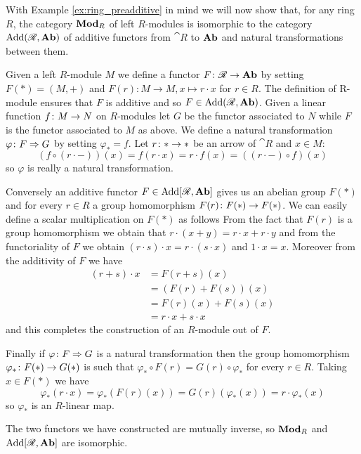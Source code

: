 \begin{example}
  \label{ex:category_of_additive_functors}
  With Example \ref{ex:ring_preadditive} in mind we will now show that, for any ring \(R\), the category \(\text{\normalfont\textbf{Mod}}_R\) of left \(R\)-modules is isomorphic to the category \(\text{Add}({\mathscr R},\text{\normalfont\textbf{Ab}})\) of additive functors from \(\cat{R}\) to \(\text{\normalfont\textbf{Ab}}\) and natural transformations between them.
  
  Given a left \(R\)-module \(M\) we define a functor \(F\colon{\mathscr R}\to\text{\normalfont\textbf{Ab}}\) by setting \(F(*) = (M, +)\) and \(F(r)\colon M\to M,x\mapsto r\cdot x\) for \(r\in R\). The definition of R-module ensures that \(F\) is additive and so \(F\in\text{Add}({\mathscr R},\text{\normalfont\textbf{Ab}})\). Given a linear function \(f\colon M\to N\) on \(R\)-modules let \(G\) be the functor associated to \(N\) while \(F\) is the functor associated to \(M\) as above. We define a natural transformation \(\varphi\colon F\Rightarrow G\) by setting \(\varphi_* = f\). Let \(r\colon *\to *\) be an arrow of \(\cat{R}\) and \(x\in M\):
  \begin{equation*}
    (f\circ(r\cdot-))(x) = f(r\cdot x) = r\cdot f(x) = ((r\cdot-)\circ f)(x)
  \end{equation*}
  so \(\varphi\) is really a natural transformation.

  Conversely an additive functor \(F\in\text{\normalfont Add}[{\mathscr R}, \text{\normalfont\textbf{Ab}}]\) gives us an abelian group \(F(*)\) and for every \(r\in R\) a group homomorphism \(F(r)\colon F(*)\to F(*)\). We can easily define a scalar multiplication on \(F(*)\) as follows
  From the fact that \(F(r)\) is a group homomorphism we obtain that \(r\cdot (x + y) = r\cdot x + r\cdot y\) and from the functoriality of \(F\) we obtain \((r\cdot s)\cdot x = r\cdot(s\cdot x)\) and \(1\cdot x = x\). Moreover from the additivity of \(F\) we have
  \begin{align*}
    (r + s)\cdot x &= F(r + s)(x)\\
                   &= (F(r) + F(s))(x) \tag{\(*\)}\\
                   &= F(r)(x) + F(s)(x)\\
                   &= r\cdot x + s\cdot x
  \end{align*}
  and this completes the construction of an \(R\)-module out of \(F\).

  Finally if \(\varphi\colon F\Rightarrow G\) is a natural transformation then the group homomorphism \(\varphi_*\colon F(*)\to G(*)\) is such that \(\varphi_*\circ F(r) = G(r)\circ\varphi_*\) for every \(r\in R\). Taking \(x\in F(*)\) we have
  \begin{equation*}
    \varphi_*(r\cdot x) = \varphi_*(F(r)(x)) = G(r)(\varphi_*(x)) = r\cdot\varphi_*(x)
  \end{equation*}
  so \(\varphi_*\) is an \(R\)-linear map.

  The two functors we have constructed are mutually inverse, so \(\text{\normalfont\textbf{Mod}}_R\) and \(\text{\normalfont Add}[{\mathscr R}, \text{\normalfont\textbf{Ab}}]\) are isomorphic.
\end{example}

